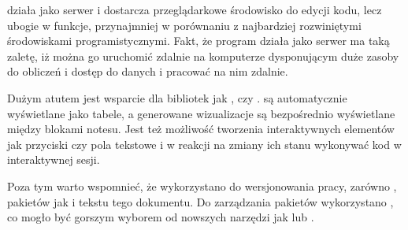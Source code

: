  działa jako serwer  i dostarcza przeglądarkowe środowisko do edycji kodu, lecz
ubogie w funkcje, przynajmniej w porównaniu z najbardziej rozwiniętymi środowiskami programistycznymi. Fakt, że
program działa jako serwer ma taką zaletę, iż można go uruchomić zdalnie na komputerze dysponującym duże zasoby
do obliczeń i dostęp do danych i pracować na nim zdalnie.

Dużym atutem jest wsparcie dla bibliotek jak ,  czy .
 są automatycznie wyświetlane jako tabele, a generowane wizualizacje są bezpośrednio wyświetlane
między blokami notesu. Jest też możliwość tworzenia interaktywnych elementów jak przyciski czy pola tekstowe i
w reakcji na zmiany ich stanu wykonywać kod w interaktywnej sesji.

Poza tym warto wspomnieć, że wykorzystano  do wersjonowania pracy, zarówno , pakietów jak i tekstu tego dokumentu. Do zarządzania pakietów wykorzystano , co mogło być gorszym wyborem od nowszych narzędzi jak  lub .

